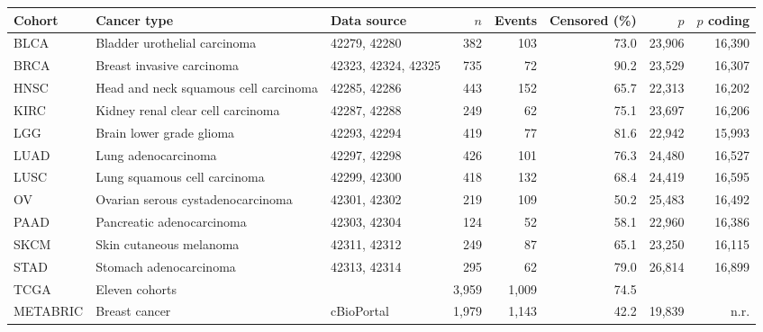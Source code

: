 \begin{tabularx}{\linewidth}{@{}l >{\raggedright\arraybackslash}X l rrrrr@{}}
\toprule
Cohort & Cancer type & Data source & $n$ & Events & Censored (\%) & $p$ & $p$ coding \\
\midrule
BLCA & Bladder urothelial carcinoma & 42279, 42280 & 382 & 103 & 73.0 & 23{,}906 & 16{,}390 \\
BRCA & Breast invasive carcinoma & 42323, 42324, 42325 & 735 & 72 & 90.2 & 23{,}529 & 16{,}307 \\
HNSC & Head and neck squamous cell carcinoma & 42285, 42286 & 443 & 152 & 65.7 & 22{,}313 & 16{,}202 \\
KIRC & Kidney renal clear cell carcinoma & 42287, 42288 & 249 & 62 & 75.1 & 23{,}697 & 16{,}206 \\
LGG & Brain lower grade glioma & 42293, 42294 & 419 & 77 & 81.6 & 22{,}942 & 15{,}993 \\
LUAD & Lung adenocarcinoma & 42297, 42298 & 426 & 101 & 76.3 & 24{,}480 & 16{,}527 \\
LUSC & Lung squamous cell carcinoma & 42299, 42300 & 418 & 132 & 68.4 & 24{,}419 & 16{,}595 \\
OV & Ovarian serous cystadenocarcinoma & 42301, 42302 & 219 & 109 & 50.2 & 25{,}483 & 16{,}492 \\
PAAD & Pancreatic adenocarcinoma & 42303, 42304 & 124 & 52 & 58.1 & 22{,}960 & 16{,}386 \\
SKCM & Skin cutaneous melanoma & 42311, 42312 & 249 & 87 & 65.1 & 23{,}250 & 16{,}115 \\
STAD & Stomach adenocarcinoma & 42313, 42314 & 295 & 62 & 79.0 & 26{,}814 & 16{,}899 \\
\midrule
TCGA & Eleven cohorts &  & 3{,}959 & 1{,}009 & 74.5 &  &  \\
METABRIC & Breast cancer & cBioPortal & 1{,}979 & 1{,}143 & 42.2 & 19{,}839 & n.r. \\
\bottomrule
\end{tabularx}
